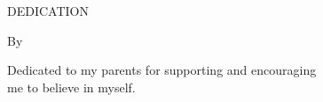 \chapter*{\normalfont\MakeUppercase\thetitle}

\parbox{\textwidth}{\centering\MakeUppercase{Dedication}

\vspace{15pt}{\noindent\newline A Thesis}

\vspace{8pt}By

\vspace{8pt}{\ifdefined\theStudyType\theFirstStudent\fi}
}

\vspace{5ex}
{\parbox{\textwidth}{\large\centering Dedicated to my parents for supporting and encouraging \\me to believe in myself.}}